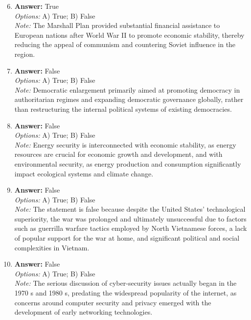 \documentclass[12pt]{article}
\begin{document}
\begin{enumerate}[label=\arabic*.]
\setcounter{enumi}{5}
\item \textbf{Answer:} True
\\ \textit{Options:} A) True; B) False
\\ \textit{Note:} The Marshall Plan provided substantial financial assistance to European nations after World War II to promote economic stability, thereby reducing the appeal of communism and countering Soviet influence in the region.
\item \textbf{Answer:} False
\\ \textit{Options:} A) True; B) False
\\ \textit{Note:} Democratic enlargement primarily aimed at promoting democracy in authoritarian regimes and expanding democratic governance globally, rather than restructuring the internal political systems of existing democracies.
\item \textbf{Answer:} False
\\ \textit{Options:} A) True; B) False
\\ \textit{Note:} Energy security is interconnected with economic stability, as energy resources are crucial for economic growth and development, and with environmental security, as energy production and consumption significantly impact ecological systems and climate change.
\item \textbf{Answer:} False
\\ \textit{Options:} A) True; B) False
\\ \textit{Note:} The statement is false because despite the United States' technological superiority, the war was prolonged and ultimately unsuccessful due to factors such as guerrilla warfare tactics employed by North Vietnamese forces, a lack of popular support for the war at home, and significant political and social complexities in Vietnam.
\item \textbf{Answer:} False
\\ \textit{Options:} A) True; B) False
\\ \textit{Note:} The serious discussion of cyber-security issues actually began in the 1970 s and 1980 s, predating the widespread popularity of the internet, as concerns around computer security and privacy emerged with the development of early networking technologies.
\end{enumerate}
\end{document}
